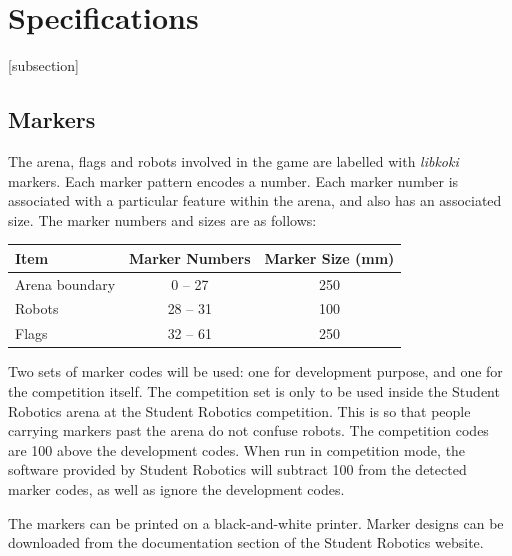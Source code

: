 \section{Specifications}
\label{sec:Specifications}

[subsection]
\newcommand{\rcnii}{\stepcounter{rulei}\arabic{section}.\arabic{subsection}.\arabic{rulei}}
\renewcommand{\labelenumi}{\rcnii}

\subsection{Markers}
\label{sub:markers}
The arena, flags and robots involved in the game are labelled with \textit{libkoki} markers.
Each marker pattern encodes a number.
Each marker number is associated with a particular feature within the arena, and also has an associated size.
The marker numbers and sizes are as follows:

\begin{center}
  \begin{tabular}{lcc}
    \toprule
    \textbf{Item} & \textbf{Marker Numbers} & \textbf{Marker Size (mm)} \\
    \midrule
    Arena boundary & {} 0 -- 27 & 250 \\
    Robots & 28 -- 31 & 100 \\
    Flags\footnotemark & 32 -- 61 & 250 \\
    \bottomrule
  \end{tabular}
\end{center}


Two sets of marker codes will be used: one for development purpose, and one for the competition itself.
The competition set is only to be used inside the Student Robotics arena at the Student Robotics competition.
This is so that people carrying markers past the arena do not confuse robots.
The competition codes are 100 above the development codes.
When run in competition mode, the software provided by Student Robotics will subtract 100 from the detected marker codes, as well as ignore the development codes.

The markers can be printed on a black-and-white printer.
Marker designs can be downloaded from the documentation section of the Student Robotics website.

